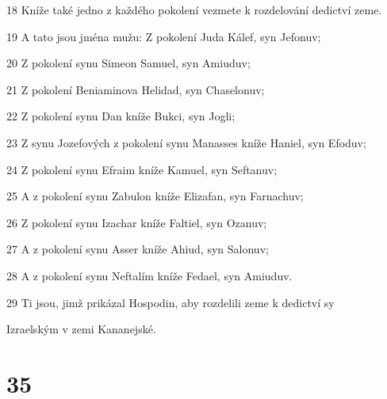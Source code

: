 \par 18 Kníže také jedno z každého pokolení vezmete k rozdelování dedictví zeme.
\par 19 A tato jsou jména mužu: Z pokolení Juda Kálef, syn Jefonuv;
\par 20 Z pokolení synu Simeon Samuel, syn Amiuduv;
\par 21 Z pokolení Beniaminova Helidad, syn Chaselonuv;
\par 22 Z pokolení synu Dan kníže Bukci, syn Jogli;
\par 23 Z synu Jozefových z pokolení synu Manasses kníže Haniel, syn Efoduv;
\par 24 Z pokolení synu Efraim kníže Kamuel, syn Seftanuv;
\par 25 A z pokolení synu Zabulon kníže Elizafan, syn Farnachuv;
\par 26 Z pokolení synu Izachar kníže Faltiel, syn Ozanuv;
\par 27 A z pokolení synu Asser kníže Ahiud, syn Salonuv;
\par 28 A z pokolení synu Neftalím kníže Fedael, syn Amiuduv.
\par 29 Ti jsou, jimž prikázal Hospodin, aby rozdelili zeme k dedictví sy\par Izraelským v zemi Kananejské.

\chapter{35}

